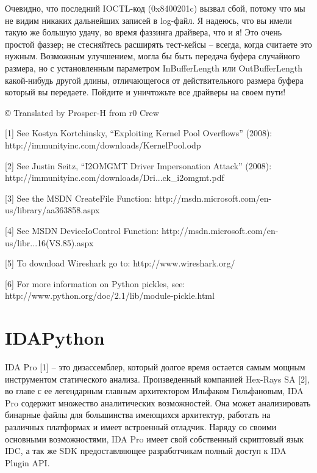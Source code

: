 \documentclass[12pt]{book}
\begin{document}


Очевидно, что последний IOCTL-код (0x8400201c) вызвал сбой, потому что мы не видим никаких дальнейших записей в log-файл. Я надеюсь, что вы имели такую же большую удачу, во время фаззинга драйвера, что и я! Это очень простой фаззер; не стесняйтесь расширять тест-кейсы – всегда, когда считаете это нужным. Возможным улучшением, могла бы быть передача буфера случайного размера, но с установленным параметром InBufferLength или OutBufferLength какой-нибудь другой длины, отличающегося от действительного размера буфера который вы передаете. Пойдите и уничтожьте все драйверы на своем пути!


© Translated by Prosper-H from r0 Crew


[1] See Kostya Kortchinsky, “Exploiting Kernel Pool Overflows” (2008):
http://immunityinc.com/downloads/KernelPool.odp

[2] See Justin Seitz, “I2OMGMT Driver Impersonation Attack” (2008):
http://immunityinc.com/downloads/Dri...ck\_i2omgmt.pdf

[3] See the MSDN CreateFile Function:
http://msdn.microsoft.com/en-us/library/aa363858.aspx

[4] See MSDN DeviceIoControl Function:
http://msdn.microsoft.com/en-us/libr...16(VS.85).aspx

[5] To download Wireshark go to:
http://www.wireshark.org/

[6] For more information on Python pickles, see:
http://www.python.org/doc/2.1/lib/module-pickle.html

\chapter{IDAPython}

IDA Pro [1] – это дизассемблер, который долгое время остается самым мощным инструментом статического анализа. Произведенный компанией Hex-Rays SA [2], во главе с ее легендарным главным архитектором Ильфаком Гильфановым, IDA Pro содержит множество аналитических возможностей. Она может анализировать бинарные файлы для большинства имеющихся архитектур, работать на различных платформах и имеет встроенный отладчик. Наряду со своими основными возможностями, IDA Pro имеет свой собственный скриптовый язык IDC, а так же SDK предоставляющее разработчикам полный доступ к IDA Plugin API.
\end{document}
